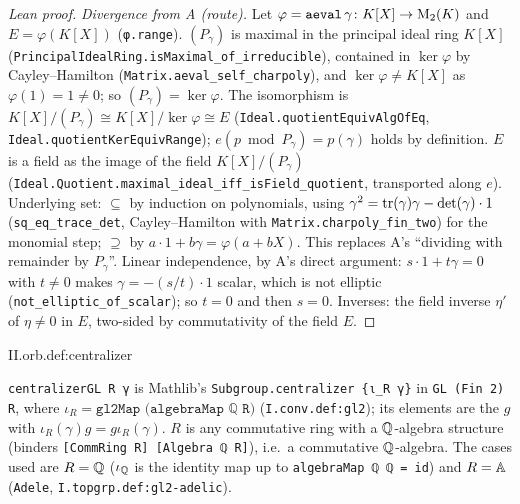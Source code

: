 \begin{proof}[Lean proof]
\emph{Divergence from A (route).} Let $\varphi=\texttt{aeval}\,\gamma\colon K[X]\to\mathrm{M}_2(K)$ and $E=\varphi(K[X])$ (\texttt{φ.range}). $(P_\gamma)$ is maximal in the principal ideal ring $K[X]$ (\texttt{PrincipalIdealRing.isMaximal\_of\_irreducible}), contained in $\ker\varphi$ by Cayley--Hamilton (\texttt{Matrix.aeval\_self\_charpoly}), and $\ker\varphi\ne K[X]$ as $\varphi(1)=1\ne0$; so $(P_\gamma)=\ker\varphi$. The isomorphism is $K[X]/(P_\gamma)\cong K[X]/\ker\varphi\cong E$ (\texttt{Ideal.quotientEquivAlgOfEq}, \texttt{Ideal.quotientKerEquivRange}); $e(p\bmod P_\gamma)=p(\gamma)$ holds by definition. $E$ is a field as the image of the field $K[X]/(P_\gamma)$ (\texttt{Ideal.Quotient.maximal\_ideal\_iff\_isField\_quotient}, transported along $e$). Underlying set: $\subseteq$ by induction on polynomials, using $\gamma^2=\operatorname{tr}(\gamma)\gamma-\det(\gamma)\cdot1$ (\texttt{sq\_eq\_trace\_det}, Cayley--Hamilton with \texttt{Matrix.charpoly\_fin\_two}) for the monomial step; $\supseteq$ by $a\cdot1+b\gamma=\varphi(a+bX)$. This replaces A's ``dividing with remainder by $P_\gamma$''. Linear independence, by A's direct argument: $s\cdot1+t\gamma=0$ with $t\ne0$ makes $\gamma=-(s/t)\cdot1$ scalar, which is not elliptic (\texttt{not\_elliptic\_of\_scalar}); so $t=0$ and then $s=0$. Inverses: the field inverse $\eta'$ of $\eta\ne0$ in $E$, two-sided by commutativity of the field $E$.
\end{proof}

\begin{definition}[centralizers]
\end{definition}
\begin{tfformal}{II.orb.def:centralizer}
\begin{tffidelity}
\texttt{centralizerGL R γ} is Mathlib's \texttt{Subgroup.centralizer \{ι\_R γ\}} in \texttt{GL (Fin 2) R}, where $\iota_R=\texttt{gl2Map (algebraMap ℚ R)}$ (\texttt{I.conv.def:gl2}); its elements are the $g$ with $\iota_R(\gamma)g=g\iota_R(\gamma)$. $R$ is any commutative ring with a $\mathbb{Q}$-algebra structure (binders \texttt{[CommRing R] [Algebra ℚ R]}), i.e.\ a commutative $\mathbb{Q}$-algebra. The cases used are $R=\mathbb{Q}$ ($\iota_{\mathbb{Q}}$ is the identity map up to \texttt{algebraMap ℚ ℚ = id}) and $R=\mathbb{A}$ (\texttt{Adele}, \texttt{I.topgrp.def:gl2-adelic}).
\end{tffidelity}
\end{tfformal}

